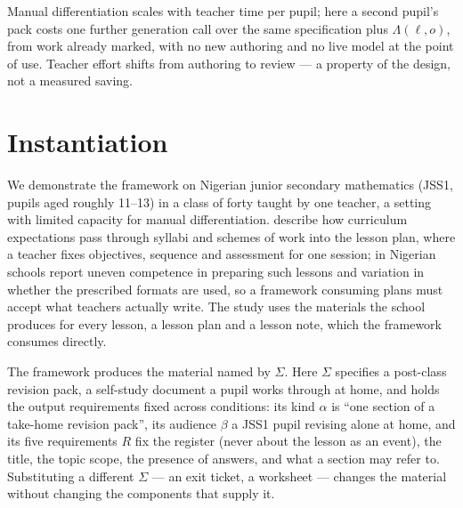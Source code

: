 \documentclass{article}
\begin{document}
Manual differentiation scales with teacher time per pupil; here a second pupil's pack costs one
further generation call over the same specification plus $\Lambda(\ell,o)$, from work already
marked, with no new authoring and no live model at the point of use. Teacher effort shifts from
authoring to review --- a property of the design, not a measured saving.

\section{Instantiation}
\label{sec:instantiation}

We demonstrate the framework on Nigerian junior secondary mathematics (JSS1, pupils aged
roughly 11--13) in a class of forty taught by one teacher, a setting with limited capacity for
manual differentiation. \citet{musingafi2015} describe how curriculum expectations pass through
syllabi and schemes of work into the lesson plan, where a teacher fixes objectives, sequence and
assessment for one session; in Nigerian schools \citet{ajayi2015} report uneven competence in
preparing such lessons and \citet{ayovaughan2022} variation in whether the prescribed formats
are used, so a framework consuming plans must accept what teachers actually write. The study uses
the materials the school produces for every lesson, a lesson plan and a lesson note, which the
framework consumes directly.

The framework produces the material named by $\Sigma$. Here $\Sigma$ specifies a post-class
revision pack, a self-study document a pupil works through at home, and holds the output
requirements fixed across conditions: its kind $\alpha$ is ``one section of a take-home revision
pack'', its audience $\beta$ a JSS1 pupil revising alone at home, and its five requirements $R$
fix the register (never about the lesson as an event), the title, the topic scope, the presence
of answers, and what a section may refer to. Substituting a different $\Sigma$ --- an exit
ticket, a worksheet --- changes the material without changing the components that supply it.
\end{document}
